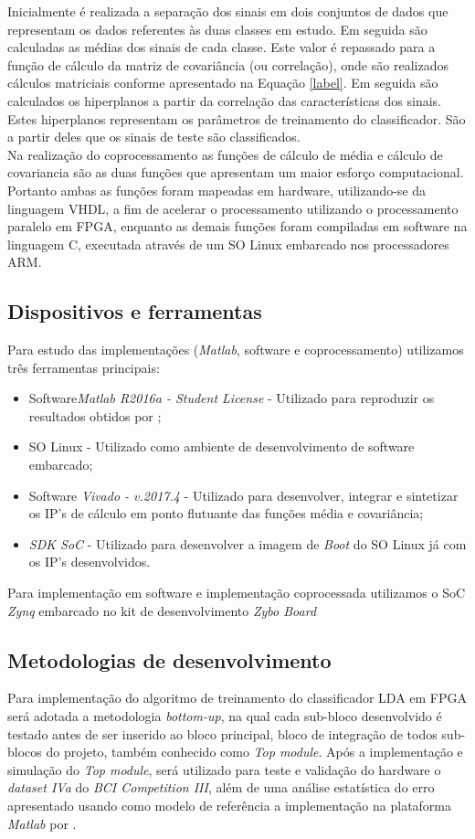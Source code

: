 Inicialmente é realizada a separação dos sinais em dois conjuntos de dados que representam os dados referentes às duas classes em estudo. Em seguida são calculadas as médias dos sinais de cada classe. Este valor é repassado para a função de cálculo da matriz de covariância (ou correlação), onde são realizados cálculos matriciais conforme apresentado na Equação \ref{label}. Em seguida são calculados os hiperplanos a partir da correlação das características dos sinais. Estes hiperplanos representam os parâmetros de treinamento do classificador. São a partir deles que os sinais de teste são classificados.\\

Na realização do coprocessamento as funções de cálculo de média e cálculo de covariancia são as duas funções que apresentam um maior esforço computacional. Portanto ambas as funções foram mapeadas em hardware, utilizando-se da linguagem VHDL, a fim de acelerar o processamento utilizando o processamento paralelo em FPGA, enquanto as demais funções foram compiladas em software na linguagem C, executada através de um SO Linux embarcado nos processadores ARM.

\subsection{Dispositivos e ferramentas}
Para estudo das implementações (\textit{Matlab}, software e coprocessamento) utilizamos três ferramentas principais:\\
\begin{itemize}
	\item Software\textit{Matlab R2016a - \textit{Student License}} - Utilizado para reproduzir os resultados obtidos por \cite{F.Lotte};
	\item SO Linux - Utilizado como ambiente de desenvolvimento de software embarcado;
	\item Software \textit{Vivado - v.2017.4} - Utilizado para desenvolver, integrar e sintetizar os IP's de cálculo em ponto flutuante das funções média e covariância;
	\item \textit{SDK SoC} - Utilizado para desenvolver a imagem de \textit{Boot} do SO Linux já com os IP's desenvolvidos.
\end{itemize}
Para implementação em software e implementação coprocessada utilizamos o SoC \textit{Zynq} embarcado no kit de desenvolvimento \textit{Zybo Board}

\subsection{Metodologias de desenvolvimento}
Para implementação do algoritmo de treinamento do classificador LDA em FPGA será adotada a metodologia \textit{bottom-up}, na qual cada sub-bloco desenvolvido é testado antes de ser inserido ao bloco principal, bloco de integração de todos sub-blocos do projeto, também conhecido como \textit{Top module}.
Após a implementação e simulação do \textit{Top module}, será utilizado para teste e validação do hardware
 o \textit{dataset IVa} do \textit{BCI Competition III}, além de uma análise estatística do erro apresentado
usando como modelo de referência a implementação na plataforma \textit{Matlab} por \cite{F.Lotte}.

